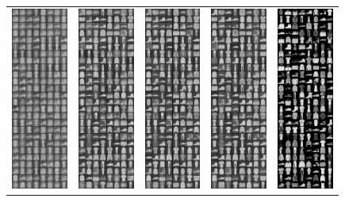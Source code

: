 \begin{figure}
\begin{centering}
\begin{tabular}{cccc|c}
\includegraphics[height=6cm]{figures/FashionMNIST/image_200} & \includegraphics[height=6cm]{figures/FashionMNIST/image_2000} & \includegraphics[height=6cm]{figures/FashionMNIST/image_10000} & \includegraphics[height=6cm]{figures/FashionMNIST/image_38400} & \includegraphics[height=6cm]{figures/FashionMNIST/dataset_example}\tabularnewline

\end{tabular}
\end{centering}
\end{figure}
